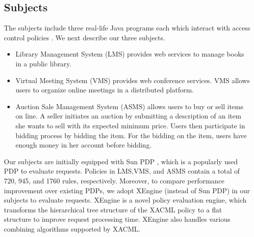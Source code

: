 \subsection{Subjects}
The subjects include three real-life Java programs each which
interact with access control policies \cite{testcase}. We next describe
our three subjects.
\begin{itemize}	
\item Library Management System (LMS) provides web services to manage books in a public library.
\item Virtual Meeting System (VMS) provides web conference services. VMS allows users to organize
online meetings in a distributed platform.
\item Auction Sale Management System (ASMS) allows users to buy or sell items on line. A seller initiates an auction by submitting a description of an item she wants to sell with its expected minimum price. Users then participate in bidding process by
bidding the item. For the bidding on the item, users have enough money in her account before bidding.
\end{itemize}

Our subjects are initially equipped with Sun PDP \cite{sunxacml}, which is
a popularly used PDP to evaluate requests.
Policies in LMS,VMS, and ASMS contain a total of 720, 945, and 1760 rules, respectively.
Moreover, to compare performance improvement over existing PDPs,
we adopt XEngine (instead of Sun PDP) in our subjects to evaluate requests.
XEngine is a novel policy evaluation engine, which transforms the hierarchical tree structure of the XACML policy to a flat structure
to improve request processing time. XEngine also handles various combining algorithms supported by XACML.
 


